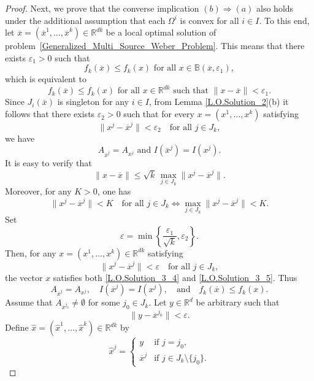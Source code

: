 \documentclass[sn-mathphys-num]{sn-jnl}%
\def\Hat{\widehat}
\theoremstyle{definition}
\begin{document}
\begin{proof}
	
	Next, we prove that the converse implication $(b)\Rightarrow(a)$ also holds under the additional assumption that each $\Omega^i$ is convex for all $i\in I$. To this end, let $\overline{x}=(\overline{x}^1,\dots,\overline{x}^k)\in \mathbb{R}^{dk}$ be a local optimal solution of problem~\eqref{Generalized_Multi_Source_Weber_Problem}. This means that there exists $\varepsilon_1>0$ such that
	\[
	f_k(\overline{x})\leq f_k(x) \text{ for all } x \in \mathbb{B}(\overline{x},\varepsilon_1),
	\]
	which is equivalent to
	\begin{equation}
		\label{L.O.Solution_3_4}
		f_k(\overline{x})\leq f_k(x) \text{ for all } x\in \mathbb{R}^{dk} \text{ such that } \|x-\overline{x}\|<\varepsilon_1.
	\end{equation}
	Since $J_i(\overline{x})$ is singleton for any $i \in I$, from Lemma \ref{L.O.Solution_2}(b) it follows that there exists $\varepsilon_2>0$ such that for every $x = (x^1,\dots,x^k)$ satisfying
    \[
    \|x^j-\overline{x}^j\|<\varepsilon_2\quad \text{for all }j \in J_k,
    \]
    we have
	\begin{equation}
		\label{L.O.Solution_3_5}
		A_{\overline{x}^j}=A_{x^j} \text{ and } I(\overline{x}^j)=I(x^j).
	\end{equation}
	It is easy to verify that
	\[
	\|x-\overline{x}\|\leq \sqrt{k}\,\max_{j\in J_k}\|x^j-\overline{x}^j\|.
	\]
	Moreover, for any $K>0$, one has
	\[
	\|x^j-\overline{x}^j\|<K \quad \text{for all } j \in J_k
	\Longleftrightarrow
	\max_{j\in J_k}\|x^j-\overline{x}^j\|<K.
	\]
	Set
	\[
	\varepsilon=\min\left\{\frac{\varepsilon_1}{\sqrt{k}},\varepsilon_2\right\}.
	\]
	Then, for any $x=(x^1,\dots,x^k)\in \mathbb{R}^{dk}$ satisfying
	\[
	\|x^j-\overline{x}^j\|<\varepsilon \quad \text{for all } j \in J_k,
	\]
	the vector $x$ satisfies both \eqref{L.O.Solution_3_4} and \eqref{L.O.Solution_3_5}. Thus
	\begin{equation}
		\label{L.O.Solution_3_6}
		A_{\overline{x}^j}=A_{x^j},\quad I(\overline{x}^j)=I(x^j),\quad\text{and}\quad     f_k(\overline{x})\leq f_k(x).
	\end{equation}
	Assume that $A_{\overline{x}^{j_0}} \neq \emptyset$ for some $j_0 \in J_k$. Let $y \in \mathbb{R}^d$ be arbitrary such that
	\[
	\|y-\overline{x}^{j_0}\|<\varepsilon.
	\]
	Define $\Hat{x}=(\Hat{x}^1,\dots,\Hat{x}^k)\in \mathbb{R}^{dk}$ by
    \begin{equation}
    \label{Hat_x_def}
    	\Hat{x}^j=
	\begin{cases}
		y & \text{if } j=j_0,\\
		\overline{x}^j & \text{if } j \in J_k\setminus\{j_0\}.

\end{cases}
\end{equation}
\end{proof}
\end{document}
